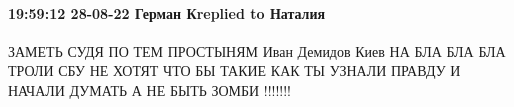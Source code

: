  
 
 
 
 

\paragraph{19:59:12 28-08-22 Герман Кreplied to Наталия}

ЗАМЕТЬ СУДЯ ПО ТЕМ ПРОСТЫНЯМ Иван Демидов Киев НА БЛА БЛА БЛА ТРОЛИ СБУ НЕ
ХОТЯТ ЧТО БЫ ТАКИЕ КАК ТЫ УЗНАЛИ ПРАВДУ И НАЧАЛИ ДУМАТЬ А НЕ БЫТЬ ЗОМБИ !!!!!!!

